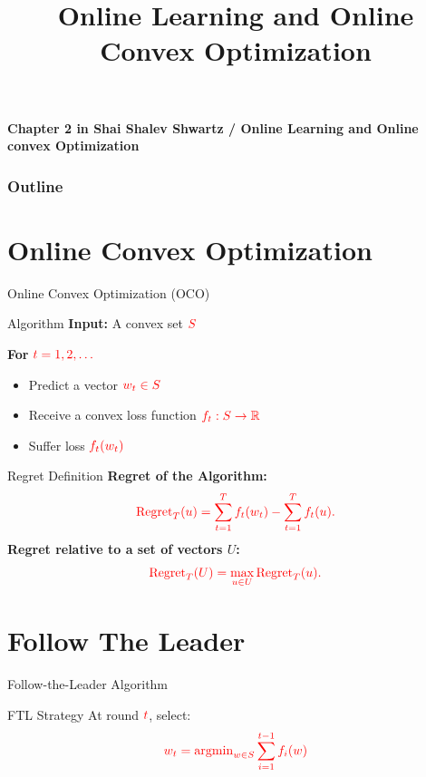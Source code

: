 \documentclass[handout]{beamer}
\title{Online Learning and Online Convex Optimization}
\date{}
\begin{document}
\begin{small}
\begin{frame}
  \titlepage
{\bf Chapter 2 in Shai Shalev Shwartz / Online Learning and Online convex Optimization} 
\end{frame}

\begin{frame}
  \frametitle{Outline}
  \tableofcontents[pausesections]
\end{frame}

\section{Online Convex Optimization}
\begin{frame}{Online Convex Optimization (OCO)}
\begin{block}{Algorithm}
\textbf{Input:} A convex set \( \textcolor{red}{S} \)

\textbf{For} \( \textcolor{red}{t = 1,2,\dots} \)
\begin{itemize}
    \item Predict a vector \( \textcolor{red}{w_t \in S} \)
    \item Receive a convex loss function \( \textcolor{red}{f_t: S \to \mathbb{R}} \)
    \item Suffer loss \( \textcolor{red}{f_t(w_t)} \)
\end{itemize}
\end{block}
\end{frame}

\begin{frame}{Regret Definition}
    \textbf{Regret of the Algorithm:}
    \begin{equation}
        \textcolor{red}{\text{Regret}_T(u) = \sum_{t=1}^{T} f_t(w_t) - \sum_{t=1}^{T} f_t(u).}
    \end{equation}
    \textbf{Regret relative to a set of vectors \( U \):}
    \begin{equation}
        \textcolor{red}{\text{Regret}_T(U) = \max_{u \in U} \text{Regret}_T(u).}
    \end{equation}
\end{frame}


\newcommand{\mathred}[1]{\textcolor{red}{#1}} %
\section{Follow The Leader}
\begin{frame}{Follow-the-Leader Algorithm}
\begin{block}{FTL Strategy}
At round $\mathred{t}$, select:
\[
\mathred{w_t = \operatorname{argmin}_{w \in S} \sum_{i=1}^{t-1} f_i(w)}
\]
\end{block}


\end{frame}
\end{small}
\end{document}
